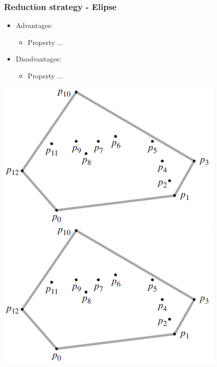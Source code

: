 \begin{frame}
\frametitle{Reduction strategy - Elipse}
\begin{multicols}{2}
	\begin{itemize}
		\item Advantages:
		\begin{itemize}
			\item Property ...
		\end{itemize}
		\item Disadvantages:
		\begin{itemize}
			\item Property ...
		\end{itemize}
	\end{itemize}
\columnbreak
	\begin{center}
		\includegraphics[scale=0.5]{graphics/convexHull-example}\\
		\includegraphics[scale=0.5]{graphics/convexHull-example}
	\end{center}
\end{multicols}
\end{frame}	
